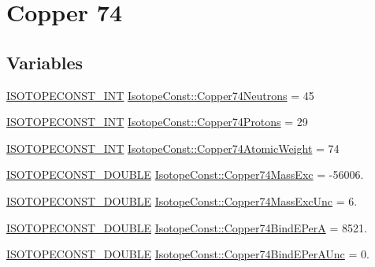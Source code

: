 \hypertarget{group___isotope_const-_copper-_cu74}{}\section{Copper 74}
\label{group___isotope_const-_copper-_cu74}
\subsection*{Variables}
\begin{DoxyCompactItemize}
\item 
\mbox{\hyperlink{group___isotope_const-_macros_ga5f18360b3e99483a35c32d789e62621c}{I\+S\+O\+T\+O\+P\+E\+C\+O\+N\+S\+T\+\_\+\+I\+NT}} \mbox{\hyperlink{group___isotope_const-_copper-_cu74_gab8c99fde43a45828532b59eaee2823f0}{Isotope\+Const\+::\+Copper74\+Neutrons}} = 45
\item 
\mbox{\hyperlink{group___isotope_const-_macros_ga5f18360b3e99483a35c32d789e62621c}{I\+S\+O\+T\+O\+P\+E\+C\+O\+N\+S\+T\+\_\+\+I\+NT}} \mbox{\hyperlink{group___isotope_const-_copper-_cu74_ga43c8f7f3bf026cf8645521586d73c0ce}{Isotope\+Const\+::\+Copper74\+Protons}} = 29
\item 
\mbox{\hyperlink{group___isotope_const-_macros_ga5f18360b3e99483a35c32d789e62621c}{I\+S\+O\+T\+O\+P\+E\+C\+O\+N\+S\+T\+\_\+\+I\+NT}} \mbox{\hyperlink{group___isotope_const-_copper-_cu74_ga8d48e5c9ed03c34d32112bf7f917a52c}{Isotope\+Const\+::\+Copper74\+Atomic\+Weight}} = 74
\item 
\mbox{\hyperlink{group___isotope_const-_macros_ga8f45a7272ce02c0b4c65c44636ed719a}{I\+S\+O\+T\+O\+P\+E\+C\+O\+N\+S\+T\+\_\+\+D\+O\+U\+B\+LE}} \mbox{\hyperlink{group___isotope_const-_copper-_cu74_ga0513f9e8bc0c522e8d96c3c6e435f46f}{Isotope\+Const\+::\+Copper74\+Mass\+Exc}} = -\/56006.
\item 
\mbox{\hyperlink{group___isotope_const-_macros_ga8f45a7272ce02c0b4c65c44636ed719a}{I\+S\+O\+T\+O\+P\+E\+C\+O\+N\+S\+T\+\_\+\+D\+O\+U\+B\+LE}} \mbox{\hyperlink{group___isotope_const-_copper-_cu74_ga98e16f1849c42c4d6d626f98bbc6e770}{Isotope\+Const\+::\+Copper74\+Mass\+Exc\+Unc}} = 6.
\item 
\mbox{\hyperlink{group___isotope_const-_macros_ga8f45a7272ce02c0b4c65c44636ed719a}{I\+S\+O\+T\+O\+P\+E\+C\+O\+N\+S\+T\+\_\+\+D\+O\+U\+B\+LE}} \mbox{\hyperlink{group___isotope_const-_copper-_cu74_ga220b1537890e8e687098cdf639af6d91}{Isotope\+Const\+::\+Copper74\+Bind\+E\+PerA}} = 8521.
\item 
\mbox{\hyperlink{group___isotope_const-_macros_ga8f45a7272ce02c0b4c65c44636ed719a}{I\+S\+O\+T\+O\+P\+E\+C\+O\+N\+S\+T\+\_\+\+D\+O\+U\+B\+LE}} \mbox{\hyperlink{group___isotope_const-_copper-_cu74_gabd896c720fabe2f20ba2f7be4defe35f}{Isotope\+Const\+::\+Copper74\+Bind\+E\+Per\+A\+Unc}} = 0.

\end{DoxyCompactItemize}
